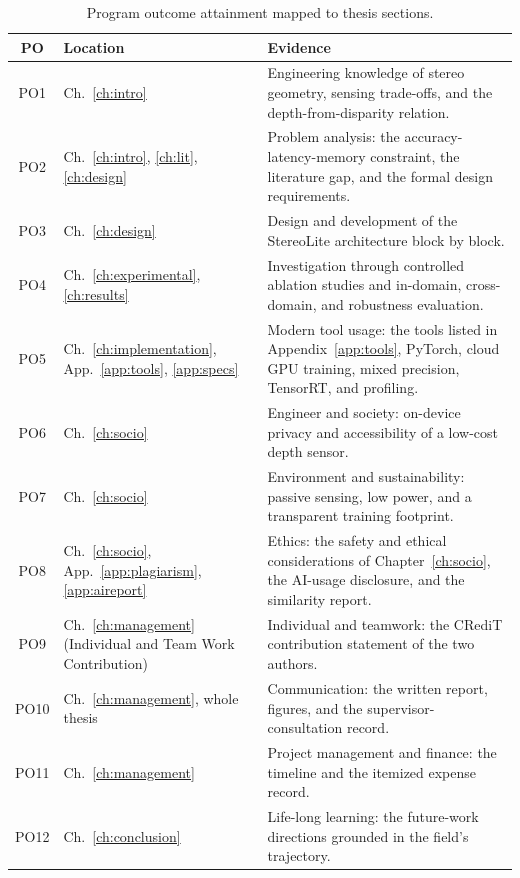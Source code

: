 \begin{table}[!htbp]
\centering
\caption{Program outcome attainment mapped to thesis sections.}
\label{tab:po_tracker}
\small
\begin{tabular}{clp{7.2cm}}
\toprule
PO & Location & Evidence\\
\midrule
PO1 & Ch.~\ref{ch:intro} & Engineering knowledge of stereo geometry, sensing trade-offs, and the depth-from-disparity relation.\\
PO2 & Ch.~\ref{ch:intro}, \ref{ch:lit}, \ref{ch:design} & Problem analysis: the accuracy-latency-memory constraint, the literature gap, and the formal design requirements.\\
PO3 & Ch.~\ref{ch:design} & Design and development of the StereoLite architecture block by block.\\
PO4 & Ch.~\ref{ch:experimental}, \ref{ch:results} & Investigation through controlled ablation studies and in-domain, cross-domain, and robustness evaluation.\\
PO5 & Ch.~\ref{ch:implementation}, App.~\ref{app:tools}, \ref{app:specs} & Modern tool usage: the tools listed in Appendix~\ref{app:tools}, PyTorch, cloud GPU training, mixed precision, TensorRT, and profiling.\\
PO6 & Ch.~\ref{ch:socio} & Engineer and society: on-device privacy and accessibility of a low-cost depth sensor.\\
PO7 & Ch.~\ref{ch:socio} & Environment and sustainability: passive sensing, low power, and a transparent training footprint.\\
PO8 & Ch.~\ref{ch:socio}, App.~\ref{app:plagiarism}, \ref{app:aireport} & Ethics: the safety and ethical considerations of Chapter~\ref{ch:socio}, the AI-usage disclosure, and the similarity report.\\
PO9 & Ch.~\ref{ch:management} (Individual and Team Work Contribution) & Individual and teamwork: the CRediT contribution statement of the two authors.\\
PO10 & Ch.~\ref{ch:management}, whole thesis & Communication: the written report, figures, and the supervisor-consultation record.\\
PO11 & Ch.~\ref{ch:management} & Project management and finance: the timeline and the itemized expense record.\\
PO12 & Ch.~\ref{ch:conclusion} & Life-long learning: the future-work directions grounded in the field's trajectory.\\
\bottomrule
\end{tabular}
\end{table}

